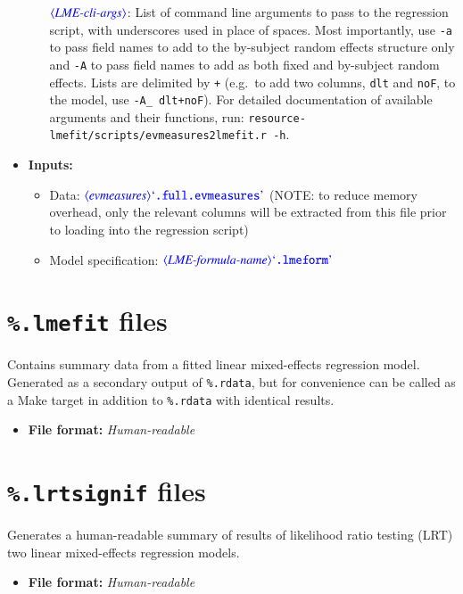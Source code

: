 \documentclass[12pt]{report}
\def\blue{\color{blue}}
\begin{document}
\begin{itemize}
\begin{itemize}
$\dtype{LME-cli-args}$: List of command line arguments to pass to the regression script, with underscores used in place of spaces.
Most importantly, use {\tt\blue -a} to pass field names to add to the by-subject random effects structure only and {\tt\blue -A} to pass field names to add as both fixed and by-subject random effects.
Lists are delimited by {\tt\blue +} (e.g.\ to add two columns, {\tt\blue dlt} and {\tt\blue noF}, to the model, use {\tt\blue -A\_ dlt+noF}).
For detailed documentation of available arguments and their functions, run: {\tt\blue resource-lmefit/scripts/evmeasures2lmefit.r -h}.
\end{itemize}
\item\textbf{Inputs:}
\begin{itemize}
\item Data: $\dtype{evmeasures} \dcode{.full.evmeasures}$ (NOTE: to reduce memory overhead, only the relevant columns will be extracted from this file prior to loading into the regression script)
\item Model specification: $\dtype{LME-formula-name} \dcode{.lmeform}$ 
\end{itemize}
\end{itemize}


\section{{\blue\tt \%.lmefit} files}

Contains summary data from a fitted linear mixed-effects regression model. Generated as a secondary output of {\blue\tt \%.rdata}, but for convenience can be called as a Make target in addition to {\blue \tt \%.rdata} with identical results.

\begin{itemize}
\item\textbf{File format:} \textit{Human-readable}
\end{itemize}

\section{{\blue\tt \%.lrtsignif} files}

Generates a human-readable summary of results of likelihood ratio testing (LRT) two linear mixed-effects regression models.

\begin{itemize}
\item\textbf{File format:} \textit{Human-readable}
\end{itemize}
\end{document}
